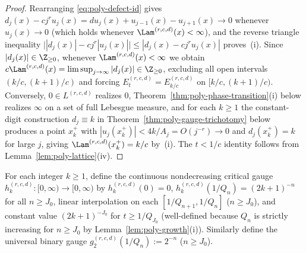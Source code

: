 \begin{proof}
Rearranging \eqref{eq:poly-defect-id} gives
$d_j(x)-cj^ru_j(x)=du_j(x)+u_{j-1}(x)-u_{j+1}(x)\to0$ whenever $u_j(x)\to0$
(which holds whenever $\Lam^{(r,c,d)}(x)<\infty$), and the reverse triangle
inequality $\bigl||d_j(x)|-cj^r|u_j(x)|\bigr|\le|d_j(x)-cj^ru_j(x)|$ proves~(i).
Since $|d_j(x)|\in\Z_{\ge0}$, whenever $\Lam^{(r,c,d)}(x)<\infty$ we obtain
$c\Lam^{(r,c,d)}(x)=\limsup_{j\to\infty}|d_j(x)|\in\Z_{\ge0}$, excluding all
open intervals $(k/c,(k+1)/c)$ and forcing $E_t^{(r,c,d)}=E_{k/c}^{(r,c,d)}$ on
$[k/c,(k+1)/c)$. Conversely, $0\in L^{(r,c,d)}$ realizes $0$,
Theorem~\ref{thm:poly-phase-transition}(i) below realizes $\infty$ on a set of
full Lebesgue measure, and for each $k\ge1$ the constant-digit construction
$d_j\equiv k$ in Theorem~\ref{thm:poly-gauge-trichotomy} below produces a point
$x_k^+$ with $|u_j(x_k^+)|<4k/A_j=O(j^{-r})\to0$ and $d_j(x_k^+)=k$ for large
$j$, giving $\Lam^{(r,c,d)}(x_k^+)=k/c$ by~(i). The $t<1/c$ identity follows from
Lemma~\ref{lem:poly-lattice}(iv).
\end{proof}

For each integer $k\ge1$, define the continuous nondecreasing critical gauge
$h_k^{(r,c,d)}:[0,\infty)\to[0,\infty)$ by $h_k^{(r,c,d)}(0)=0$,
$h_k^{(r,c,d)}(1/Q_n)=(2k+1)^{-n}$ for all $n\ge J_0$, linear interpolation on
each $[1/Q_{n+1},1/Q_n]$ ($n\ge J_0$), and constant value $(2k+1)^{-J_0}$ for
$t\ge1/Q_{J_0}$ (well-defined because $Q_n$ is strictly increasing for
$n\ge J_0$ by Lemma~\ref{lem:poly-growth}(i)). Similarly define the universal
binary gauge $g_2^{(r,c,d)}(1/Q_n):=2^{-n}$ ($n\ge J_0$).

